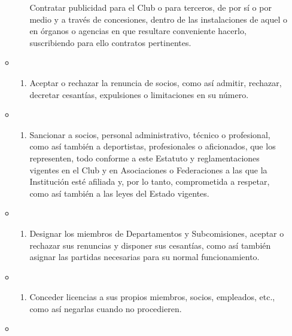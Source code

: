 \documentclass[]{book}
\providecommand{\tightlist}{%
  \setlength{\itemsep}{0pt}\setlength{\parskip}{0pt}}
\begin{document}
\begin{itemize}
\begin{itemize}
\begin{enumerate}
      Contratar publicidad para el Club o para terceros, de por sí o por
      medio y a través de concesiones, dentro de las instalaciones de
      aquel o en órganos o agencias en que resultare conveniente
      hacerlo, suscribiendo para ello contratos pertinentes.
    \end{enumerate}
  \item
    \begin{enumerate}
    \def\labelenumi{\alph{enumi})}
    \setcounter{enumi}{17}
    \tightlist
    \item
      Aceptar o rechazar la renuncia de socios, como así admitir,
      rechazar, decretar cesantías, expulsiones o limitaciones en su
      número.
    \end{enumerate}
  \item
    \begin{enumerate}
    \def\labelenumi{\alph{enumi})}
    \setcounter{enumi}{18}
    \tightlist
    \item
      Sancionar a socios, personal administrativo, técnico o
      profesional, como así también a deportistas, profesionales o
      aficionados, que los representen, todo conforme a este Estatuto y
      reglamentaciones vigentes en el Club y en Asociaciones o
      Federaciones a las que la Institución esté afiliada y, por lo
      tanto, comprometida a respetar, como así también a las leyes del
      Estado vigentes.
    \end{enumerate}
  \item
    \begin{enumerate}
    \def\labelenumi{\alph{enumi})}
    \setcounter{enumi}{19}
    \tightlist
    \item
      Designar los miembros de Departamentos y Subcomisiones, aceptar o
      rechazar sus renuncias y disponer sus cesantías, como así también
      asignar las partidas necesarias para su normal funcionamiento.
    \end{enumerate}
  \item
    \begin{enumerate}
    \def\labelenumi{\alph{enumi})}
    \setcounter{enumi}{20}
    \tightlist
    \item
      Conceder licencias a sus propios miembros, socios, empleados,
      etc., como así negarlas cuando no procedieren.
    \end{enumerate}
  \item
    \begin{enumerate}
    \def\labelenumi{\alph{enumi})}
    \setcounter{enumi}{21}
    \tightlist

\end{enumerate}
\end{itemize}
\end{itemize}
\end{document}
